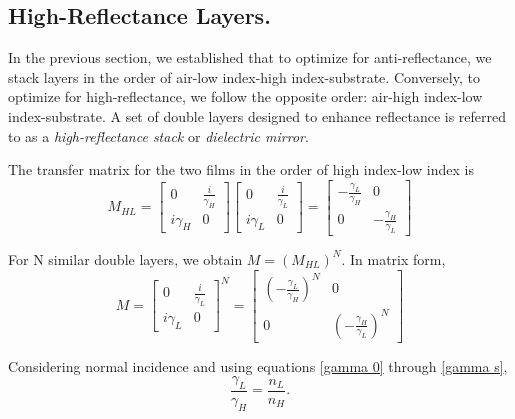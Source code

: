 \subsection{High-Reflectance Layers.}
In the previous section, we established that to optimize for anti-reflectance, we stack layers in the order of air-low index-high index-substrate. Conversely, to optimize for high-reflectance, we follow the opposite order: air-high index-low index-substrate. A set of double layers designed to enhance reflectance is referred to as a \emph{high-reflectance stack} or \emph{dielectric mirror}.

The transfer matrix for the two films in the order of high index-low index is
    \[
      M_{HL} = 
            \begin{bmatrix}
            0 & \frac{i}{\gamma_H} \\
            i\gamma_H & 0
            \end{bmatrix}
            \begin{bmatrix}
            0 & \frac{i}{\gamma_L} \\
            i\gamma_L & 0
            \end{bmatrix} =
                    \begin{bmatrix}
                        -\frac{\gamma_L}{\gamma_H} & 0  \\
                        0 & -\frac{\gamma_H}{\gamma_L}
                    \end{bmatrix}
    \]
    
For N similar double layers, we obtain $M = (M_{HL})^N$. In matrix form,
    \[
      M = 
            \begin{bmatrix}
            0 & \frac{i}{\gamma_L} \\
            i\gamma_L & 0
            \end{bmatrix}^N =
                \begin{bmatrix}
                    \left(-\frac{\gamma_L}{\gamma_H}\right)^N & 0  \\
                    0 & \left(-\frac{\gamma_H}{\gamma_L}\right)^N
                \end{bmatrix}
    \]

Considering normal incidence and using equations \ref{gamma 0} through \ref{gamma s},
\begin{equation}
    \frac{\gamma_L}{\gamma_H} = \frac{n_L}{n_H}.
\end{equation}

